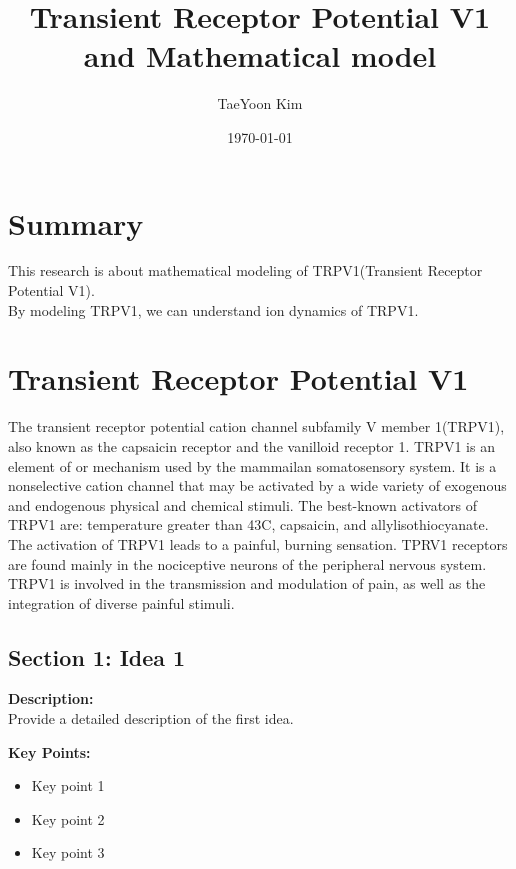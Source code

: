 \documentclass[a4paper, 12pt]{article}
\title{Transient Receptor Potential V1 and Mathematical model}
\author{TaeYoon Kim}
\date{\today}
\begin{document}
\maketitle

\section*{Summary}
\noindent
This research is about mathematical modeling of TRPV1(Transient Receptor Potential V1).\\
By modeling TRPV1, we can understand ion dynamics of TRPV1.
\vspace{1cm}

\section*{Transient Receptor Potential V1}
The transient receptor potential cation channel subfamily V member 1(TRPV1),
also known as the {\color{red}capsaicin receptor} and the vanilloid receptor 1. 
TRPV1 is an element of or mechanism used by the mammailan somatosensory system.
It is a nonselective cation channel that may be activated by
a wide variety of exogenous and endogenous physical and chemical stimuli.
The best-known activators of TRPV1 are:
temperature greater than 43{\degree}C,
capsaicin, and allylisothiocyanate.
The activation of TRPV1 leads to a painful, burning sensation.
{\color{blue}TPRV1 receptors are found mainly in the nociceptive neurons of the 
peripheral nervous system.}
TRPV1 is involved in the transmission and modulation of pain,
as well as the integration of diverse painful stimuli.

\subsection*{Section 1: Idea 1}
\noindent
\textbf{Description:} \\
Provide a detailed description of the first idea.

\vspace{0.5cm}

\noindent
\textbf{Key Points:}
\begin{itemize}
    \item Key point 1
    \item Key point 2
    \item Key point 3
\end{itemize}

\vspace{0.5cm}
\end{document}
